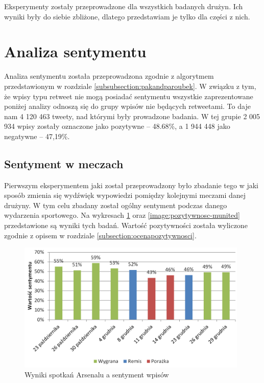 Eksperymenty zostały przeprowadzone dla wszystkich badanych drużyn.
Ich wyniki były do siebie zbliżone, dlatego przedstawiam je tylko dla części z
nich.



\section{Analiza sentymentu}
\label{section:analizasentymentu2}

Analiza sentymentu została przeprowadzona zgodnie z algorytmem przedstawionym w
rozdziale \ref{subsubsection:pakandparoubek}. W związku z tym, że wpisy typu
retweet nie mogą posiadać sentymentu wszystkie zaprezentowane poniżej analizy
odnoszą się do grupy wpisów nie będących retweetami. To daje nam 4 120 463
tweety, nad którymi były prowadzone badania. W tej grupie 2 005 934 wpisy
zostały oznaczone jako pozytywne -- 48.68\%, a 1 944 448 jako negatywne --
47,19\%.



\subsection{Sentyment w meczach}
\label{subsection:sentymentwmeczach}
Pierwszym eksperymentem jaki został przeprowadzony było zbadanie tego w jaki 
sposób zmienia się wydźwięk wypowiedzi pomiędzy kolejnymi meczami danej drużyny.
W tym celu zbadany został ogólny sentyment podczas danego wydarzenia sportowego.
Na wykresach \ref{image:pozytywnosc-arsenal} oraz 
\ref{image:pozytywnosc-munited} przedstawione są wyniki tych badań.
Wartość pozytywności została wyliczone zgodnie z opisem w rozdziale
\ref{subsection:ocenapozytywnosci}.

\clearpage

\begin{figure}[ht!]
\centering
\includegraphics[width=110mm]{img/pozytywnosc-arsenal2.png}
\caption{Wyniki spotkań Arsenalu a sentyment wpisów}
\label{image:pozytywnosc-arsenal}
\end{figure}

